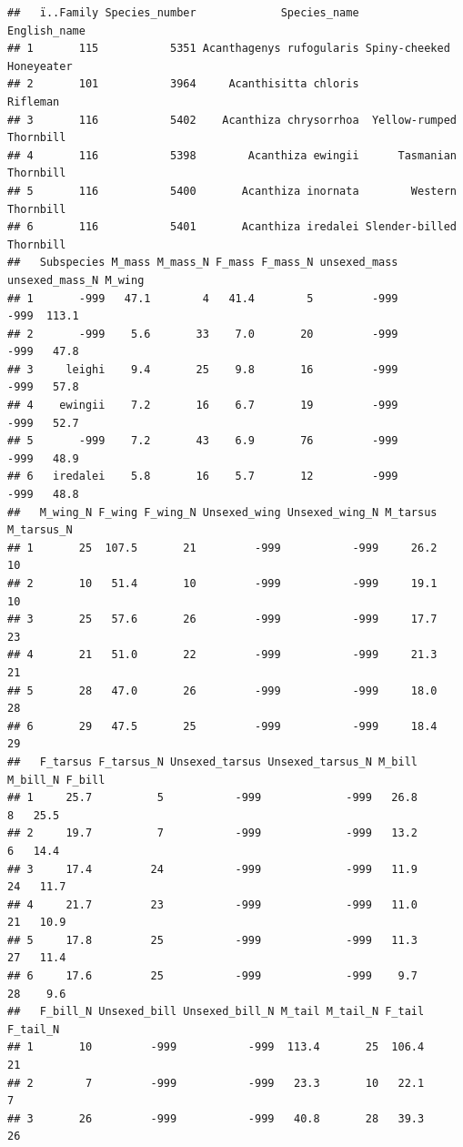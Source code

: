 \documentclass[
  12pt,
]{article}
\begin{document}
\begin{verbatim}
##   ï..Family Species_number             Species_name             English_name
## 1       115           5351 Acanthagenys rufogularis Spiny-cheeked Honeyeater
## 2       101           3964     Acanthisitta chloris                 Rifleman
## 3       116           5402    Acanthiza chrysorrhoa  Yellow-rumped Thornbill
## 4       116           5398        Acanthiza ewingii      Tasmanian Thornbill
## 5       116           5400       Acanthiza inornata        Western Thornbill
## 6       116           5401       Acanthiza iredalei Slender-billed Thornbill
##   Subspecies M_mass M_mass_N F_mass F_mass_N unsexed_mass unsexed_mass_N M_wing
## 1       -999   47.1        4   41.4        5         -999           -999  113.1
## 2       -999    5.6       33    7.0       20         -999           -999   47.8
## 3     leighi    9.4       25    9.8       16         -999           -999   57.8
## 4    ewingii    7.2       16    6.7       19         -999           -999   52.7
## 5       -999    7.2       43    6.9       76         -999           -999   48.9
## 6   iredalei    5.8       16    5.7       12         -999           -999   48.8
##   M_wing_N F_wing F_wing_N Unsexed_wing Unsexed_wing_N M_tarsus M_tarsus_N
## 1       25  107.5       21         -999           -999     26.2         10
## 2       10   51.4       10         -999           -999     19.1         10
## 3       25   57.6       26         -999           -999     17.7         23
## 4       21   51.0       22         -999           -999     21.3         21
## 5       28   47.0       26         -999           -999     18.0         28
## 6       29   47.5       25         -999           -999     18.4         29
##   F_tarsus F_tarsus_N Unsexed_tarsus Unsexed_tarsus_N M_bill M_bill_N F_bill
## 1     25.7          5           -999             -999   26.8        8   25.5
## 2     19.7          7           -999             -999   13.2        6   14.4
## 3     17.4         24           -999             -999   11.9       24   11.7
## 4     21.7         23           -999             -999   11.0       21   10.9
## 5     17.8         25           -999             -999   11.3       27   11.4
## 6     17.6         25           -999             -999    9.7       28    9.6
##   F_bill_N Unsexed_bill Unsexed_bill_N M_tail M_tail_N F_tail F_tail_N
## 1       10         -999           -999  113.4       25  106.4       21
## 2        7         -999           -999   23.3       10   22.1        7
## 3       26         -999           -999   40.8       28   39.3       26

\end{verbatim}
\end{document}
